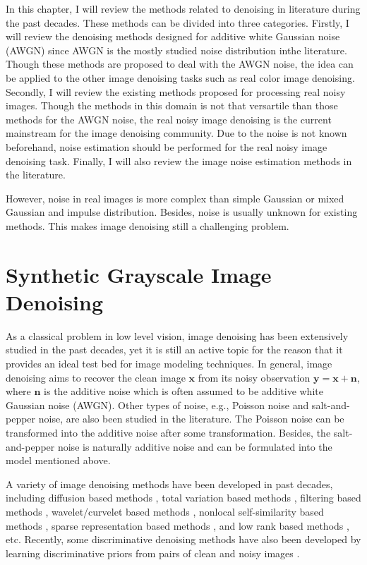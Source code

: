 In this chapter, I will review the methods related to denoising in literature during the past decades. These methods can be divided into three categories. Firstly, I will review the denoising methods designed for additive white Gaussian noise (AWGN) since AWGN is the mostly studied noise distribution inthe literature. Though these methods are proposed to deal with the AWGN noise, the idea can be applied to the other image denoising tasks such as real color image denoising. Secondly, I will review the existing methods proposed for processing real noisy images. Though the methods in this domain is not that versartile than those methods for the AWGN noise, the real noisy image denoising is the current mainstream for the image denoising community. Due to the noise is not known beforehand, noise estimation should be performed for the real noisy image denoising task. Finally, I will also review the image noise estimation methods in the literature.

However, noise in real images is more complex than simple Gaussian or mixed Gaussian and impulse distribution. Besides, noise is usually unknown for existing methods. This makes image denoising still a challenging problem.

\section{Synthetic Grayscale Image Denoising}
\label{sec:review:sys}

As a classical problem in low level vision, image denoising has been extensively studied in the past decades, yet it is still an active topic for the reason that it provides an ideal test bed for image modeling techniques. In general, image denoising aims to recover the clean image $\mathbf{x}$ from its noisy observation $\mathbf{y} = \mathbf{x} + \mathbf{n}$, where $\mathbf{n}$ is the additive noise which is often assumed to be additive white Gaussian noise (AWGN). Other types of noise, e.g., Poisson noise and salt-and-pepper noise, are also been studied in the literature. The Poisson noise can be transformed into the additive noise after some transformation. Besides, the salt-and-pepper noise is naturally additive noise and can be formulated into the model mentioned above.

A variety of image denoising methods have been developed in past decades, including diffusion based methods \cite{PeronaMalik1990}, total variation based methods \cite{rudin1992nonlinear,osher2005iterative}, filtering based methods \cite{Tomasi1998}, wavelet/curvelet based methods \cite{softthresholding,bayesshrink,curvelet}, nonlocal self-similarity based methods \cite{nlm,bm3d}, sparse representation based methods \cite{ksvd,lssc,ncsr}, and low rank based methods \cite{nnm,wnnm}, etc. Recently, some discriminative denoising methods have also been developed by learning discriminative priors from pairs of clean and noisy images \cite{mlp,csf,tnrd}.

